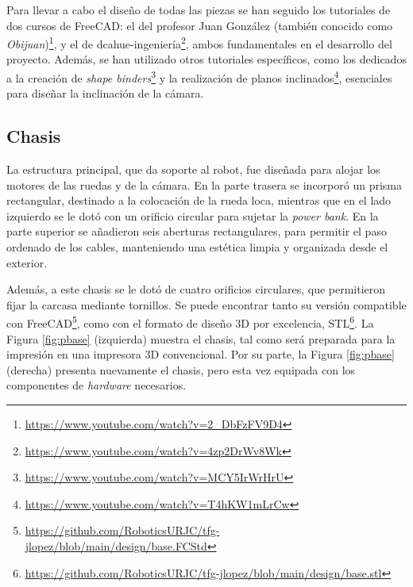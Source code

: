 Para llevar a cabo el diseño de todas las piezas se han seguido los tutoriales de dos cursos de FreeCAD: el del profesor Juan González (también conocido como \textit{Obijuan})\footnote{\url{https://www.youtube.com/watch?v=2_DbFzFV9D4}}, y el de dcahue-ingeniería\footnote{\url{https://www.youtube.com/watch?v=4zp2DrWv8Wk}}, ambos fundamentales en el desarrollo del proyecto. Además, se han utilizado otros tutoriales específicos, como los dedicados a la creación de \textit{shape binders}\footnote{\url{https://www.youtube.com/watch?v=MCY5IrWrHrU}} y la realización de planos inclinados\footnote{\url{https://www.youtube.com/watch?v=T4hKW1mLrCw}}, esenciales para diseñar la inclinación de la cámara.

\subsection{Chasis}
\label{subsec:chasis}

La estructura principal, que da soporte al robot, fue diseñada para alojar los motores de las ruedas y de la cámara. En la parte trasera se incorporó un prisma rectangular, destinado a la colocación de la rueda loca, mientras que en el lado izquierdo se le dotó con un orificio circular para sujetar la \textit{power bank}. En la parte superior se añadieron seis aberturas rectangulares, para permitir el paso ordenado de los cables, manteniendo una estética limpia y organizada desde el exterior.

Además, a este chasis se le dotó de cuatro orificios circulares, que permitieron fijar la carcasa mediante tornillos. Se puede encontrar tanto su versión compatible con FreeCAD\footnote{\url{https://github.com/RoboticsURJC/tfg-jlopez/blob/main/design/base.FCStd}}, como con el formato de diseño 3D por excelencia, STL\footnote{\url{https://github.com/RoboticsURJC/tfg-jlopez/blob/main/design/base.stl}}. La Figura \ref{fig:pbase} (izquierda) muestra el chasis, tal como será preparada para la impresión en una impresora 3D convencional. Por su parte, la Figura \ref{fig:pbase} (derecha) presenta nuevamente el chasis, pero esta vez equipada con los componentes de \textit{hardware} necesarios.

